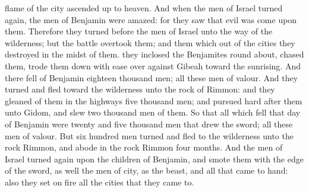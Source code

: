 {flame of the
city ascended
up to
heaven.
And when the
men of
Israel turned
again, the
men of
Benjamin were
amazed: for they
saw that
evil was
come upon them.
Therefore they
turned
{}
before the
men of
Israel unto the
way of the
wilderness; but the
battle
overtook them; and them which
{} out of the
cities they
destroyed in the
midst of them.
 they
inclosed the
Benjamites round
about,
{}
chased them,
{} trode them
down with
ease over
against
Gibeah toward the
sunrising.
And there
fell of
Benjamin
eighteen
thousand
men; all these
{}
men of
valour.
And they
turned and
fled toward the
wilderness unto the
rock of
Rimmon: and they
gleaned of them in the
highways
five
thousand
men; and
pursued hard
after them unto
Gidom, and
slew two
thousand
men of them.
So that all which
fell that
day of
Benjamin were
twenty and
five
thousand
men that
drew the
sword; all these
{}
men of
valour.
But
six
hundred
men
turned and
fled to the
wilderness unto the
rock
Rimmon, and
abode in the
rock
Rimmon
four
months.
And the
men of
Israel turned
again upon the
children of
Benjamin, and
smote them with the
edge of the
sword, as well the
men of
{}
city,
as the
beast, and all that came to
hand: also they
set on
fire all the
cities that they came
to.

}
